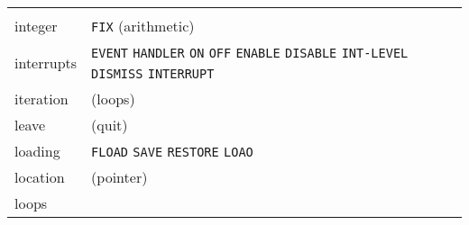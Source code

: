 \documentclass[a4paper,]{article}
\begin{document}
\begin{longtable}[]{@{}ll@{}}
\begin{minipage}[t]{0.83\columnwidth}
\end{minipage}\tabularnewline
\begin{minipage}[t]{0.11\columnwidth}\raggedright\strut
integer\strut
\end{minipage} & \begin{minipage}[t]{0.83\columnwidth}\raggedright\strut
\texttt{FIX} (arithmetic)\strut
\end{minipage}\tabularnewline
\begin{minipage}[t]{0.11\columnwidth}\raggedright\strut
interrupts\strut
\end{minipage} & \begin{minipage}[t]{0.83\columnwidth}\raggedright\strut
\texttt{EVENT} \texttt{HANDLER} \texttt{ON} \texttt{OFF} \texttt{ENABLE} \texttt{DISABLE} \texttt{INT-LEVEL}
\texttt{DISMISS} \texttt{INTERRUPT}\strut
\end{minipage}\tabularnewline
\begin{minipage}[t]{0.11\columnwidth}\raggedright\strut
iteration\strut
\end{minipage} & \begin{minipage}[t]{0.83\columnwidth}\raggedright\strut
(loops)\strut
\end{minipage}\tabularnewline
\begin{minipage}[t]{0.11\columnwidth}\raggedright\strut
leave\strut
\end{minipage} & \begin{minipage}[t]{0.83\columnwidth}\raggedright\strut
(quit)\strut
\end{minipage}\tabularnewline
\begin{minipage}[t]{0.11\columnwidth}\raggedright\strut
loading\strut
\end{minipage} & \begin{minipage}[t]{0.83\columnwidth}\raggedright\strut
\texttt{FLOAD} \texttt{SAVE} \texttt{RESTORE} \texttt{LOAO}\strut
\end{minipage}\tabularnewline
\begin{minipage}[t]{0.11\columnwidth}\raggedright\strut
location\strut
\end{minipage} & \begin{minipage}[t]{0.83\columnwidth}\raggedright\strut
(pointer)\strut
\end{minipage}\tabularnewline
\begin{minipage}[t]{0.11\columnwidth}\raggedright\strut
loops\strut
\end{minipage} & \begin{minipage}[t]{0.83\columnwidth}\raggedright\strut

\end{minipage}
\end{longtable}
\end{document}
